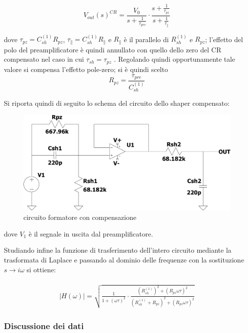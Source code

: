 \documentclass{article}
\begin{document}
\begin{equation}
    V_{out}(s)^{CR}=\frac{V_{0}}{s+\frac{1}{\tau_{pre}}}\cdot \frac{s+\frac{1}{\tau_{pz}}}{s+\frac{1}{\tau_{\parallel}}}
\end{equation}


dove $\tau_{pz}= C_{sh}^{(1)}R_{pz}$, $\tau_{\parallel}= C_{sh}^{(1)}R_{\parallel}$ e $R_{\parallel}$ è il parallelo di $R_{sh}^{(1)}$ e $R_{pz}$;
l’effetto del polo del preamplificatore è quindi annullato con quello dello zero del CR compensato nel caso in cui $\tau_{sh}=\tau_{pz}$ .
Regolando quindi opportunamente tale valore si compensa l'effetto pole-zero;
 si è quindi scelto 
$$R_{pz}= \frac{\tau_{pre}}{C_{sh}^{(1)}}$$



Si riporta quindi di seguito lo schema del circuito dello shaper compensato:
\begin{center}
    \begin{figure}[H]
    \centering
    \includegraphics[scale=0.3, angle=0]{shapercomp.pdf}
    \caption{circuito formatore con compensazione}
    \label{fig:shaper}
    \end{figure}
\end{center}
dove $V_1$ è il segnale in uscita dal preamplificatore.

Studiando infine la funzione di trasferimento dell'intero circuito  mediante la trasformata di Laplace e passando al dominio delle frequenze con la sostituzione $s\xrightarrow[]{} i\omega$ si ottiene:

\begin{multline}
    \label{eqn:shapercomp_trasf}
    |H(\omega)| =\sqrt{\frac{1}{1+(\omega\tau)^2}\cdot \frac{(R_{sh}^{(1)})^2+(R_{pz}\omega\tau)^2 }{(R_{sh}^{(1)}+R_{pz})^2+(R_{pz}\omega\tau)^2}}
\end{multline}

\subsubsection{Discussione dei dati}
\end{document}
